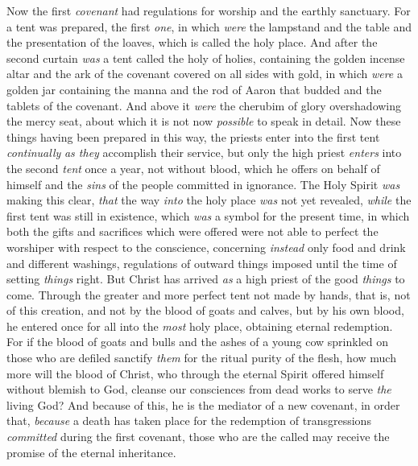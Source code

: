 \begin{biblechapter} %
 Now the first \textit{covenant} had regulations for worship and the earthly sanctuary.
\verse For a tent was prepared, the first \textit{one}, in which \textit{were} the lampstand and the table and the presentation of the loaves, which is called the holy place.
\verse And after the second curtain \textit{was} a tent called the holy of holies,
\verse containing the golden incense altar and the ark of the covenant covered on all sides with gold, in which \textit{were} a golden jar containing the manna and the rod of Aaron that budded and the tablets of the covenant.
\verse And above it \textit{were} the cherubim of glory overshadowing the mercy seat, about which it is not now \textit{possible} to speak in detail.
\verse Now these things having been prepared in this way, the priests enter into the first tent \textit{continually} \textit{as they} accomplish their service,
\verse but only the high priest \textit{enters} into the second \textit{tent} once a year, not without blood, which he offers on behalf of himself and the \textit{sins} of the people committed in ignorance.
\verse The Holy Spirit \textit{was} making this clear, \textit{that} the way \textit{into} the holy place \textit{was} not yet revealed, \textit{while} the first tent was still in existence,
\verse which \textit{was} a symbol for the present time, in which both the gifts and sacrifices which were offered were not able to perfect the worshiper with respect to the conscience,
\verse concerning \textit{instead} only food and drink and different washings, regulations of outward things imposed until the time of setting \textit{things} right.
 But Christ has arrived \textit{as} a high priest of the good \textit{things} to come. Through the greater and more perfect tent not made by hands, that is, not of this creation,
\verse and not by the blood of goats and calves, but by his own blood, he entered once for all into the \textit{most} holy place, obtaining eternal redemption.
\verse For if the blood of goats and bulls and the ashes of a young cow sprinkled on those who are defiled sanctify \textit{them} for the ritual purity of the flesh,
\verse how much more will the blood of Christ, who through the eternal Spirit offered himself without blemish to God, cleanse our consciences from dead works to serve \textit{the} living God?
\verse And because of this, he is the mediator of a new covenant, in order that, \textit{because} a death has taken place for the redemption of transgressions \textit{committed} during the first covenant, those who are the called may receive the promise of the eternal inheritance.

\end{biblechapter}
